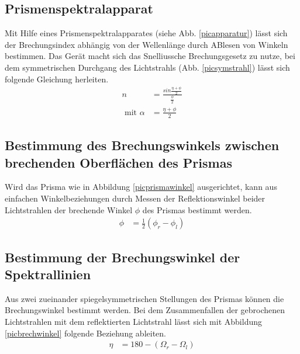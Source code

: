 \subsection{Prismenspektralapparat}
 
Mit Hilfe eines Prismenspektralapparates (siehe Abb. \ref{picapparatur}) lässt sich der Brechungsindex 
abhängig von der Wellenlänge durch ABlesen von Winkeln bestimmen. Das Gerät macht sich das Snelliussche Brechungsgesetz zu nutze,
bei dem symmetrischen Durchgang des Lichtstrahls (Abb. \ref{picsymstrahl}) lässt sich folgende Gleichung 
herleiten.
\begin{align}
n&=\frac{sin\frac{\eta + \phi}{2}}{\frac{\phi}{2}}\\
\text{ mit }\alpha&=\frac{\eta + \phi}{2}
\end{align}
\subsection{Bestimmung des Brechungswinkels zwischen brechenden Oberflächen des Prismas}

Wird das Prisma wie in Abbildung \ref{picprismawinkel} ausgerichtet, kann aus einfachen
Winkelbeziehungen durch Messen der Reflektionswinkel beider Lichtstrahlen der brechende 
Winkel $\phi$ des Prismas bestimmt werden.
\begin{align}
\phi&=\frac{1}{2}(\phi_r - \phi_l)
\end{align}
\subsection{Bestimmung der Brechungswinkel der Spektrallinien}

Aus zwei zueinander spiegelsymmetrischen Stellungen des Prismas können die Brechungswinkel
bestimmt werden. Bei dem Zusammenfallen der gebrochenen Lichtstrahlen mit dem reflektierten
Lichtstrahl lässt sich mit Abbildung \ref{picbrechwinkel} folgende Beziehung ableiten.
\begin{align}
\eta&=180-(\Omega_r-\Omega_l)
\end{align}